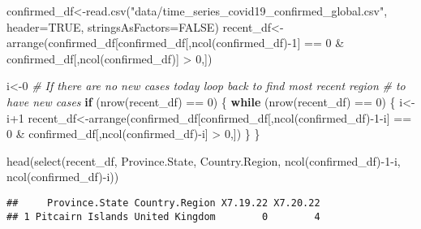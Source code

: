 \documentclass[
]{article}
\newenvironment{Shaded}{\begin{snugshade}}{\end{snugshade}}
\newcommand{\AttributeTok}[1]{\textcolor[rgb]{0.77,0.63,0.00}{#1}}
\newcommand{\CommentTok}[1]{\textcolor[rgb]{0.56,0.35,0.01}{\textit{#1}}}
\newcommand{\ConstantTok}[1]{\textcolor[rgb]{0.00,0.00,0.00}{#1}}
\newcommand{\ControlFlowTok}[1]{\textcolor[rgb]{0.13,0.29,0.53}{\textbf{#1}}}
\newcommand{\DecValTok}[1]{\textcolor[rgb]{0.00,0.00,0.81}{#1}}
\newcommand{\FunctionTok}[1]{\textcolor[rgb]{0.00,0.00,0.00}{#1}}
\newcommand{\NormalTok}[1]{#1}
\newcommand{\OtherTok}[1]{\textcolor[rgb]{0.56,0.35,0.01}{#1}}
\newcommand{\SpecialCharTok}[1]{\textcolor[rgb]{0.00,0.00,0.00}{#1}}
\newcommand{\StringTok}[1]{\textcolor[rgb]{0.31,0.60,0.02}{#1}}
\begin{document}
\begin{Shaded}
\begin{Highlighting}[]
\NormalTok{confirmed\_df}\OtherTok{\textless{}{-}}\FunctionTok{read.csv}\NormalTok{(}\StringTok{"data/time\_series\_covid19\_confirmed\_global.csv"}\NormalTok{, }
                       \AttributeTok{header=}\ConstantTok{TRUE}\NormalTok{, }\AttributeTok{stringsAsFactors=}\ConstantTok{FALSE}\NormalTok{)}
\NormalTok{recent\_df}\OtherTok{\textless{}{-}}\FunctionTok{arrange}\NormalTok{(confirmed\_df[confirmed\_df[,}\FunctionTok{ncol}\NormalTok{(confirmed\_df)}\SpecialCharTok{{-}}\DecValTok{1}\NormalTok{] }\SpecialCharTok{==} \DecValTok{0} 
                                \SpecialCharTok{\&}\NormalTok{ confirmed\_df[,}\FunctionTok{ncol}\NormalTok{(confirmed\_df)] }\SpecialCharTok{\textgreater{}} \DecValTok{0}\NormalTok{,])}

\NormalTok{i}\OtherTok{\textless{}{-}}\DecValTok{0}
\CommentTok{\# If there are no new cases today loop back to find most recent region}
\CommentTok{\# to have new cases}
\ControlFlowTok{if}\NormalTok{ (}\FunctionTok{nrow}\NormalTok{(recent\_df) }\SpecialCharTok{==} \DecValTok{0}\NormalTok{) \{}
  \ControlFlowTok{while}\NormalTok{ (}\FunctionTok{nrow}\NormalTok{(recent\_df) }\SpecialCharTok{==} \DecValTok{0}\NormalTok{) \{}
\NormalTok{    i}\OtherTok{\textless{}{-}}\NormalTok{i}\SpecialCharTok{+}\DecValTok{1}
\NormalTok{    recent\_df}\OtherTok{\textless{}{-}}\FunctionTok{arrange}\NormalTok{(confirmed\_df[confirmed\_df[,}\FunctionTok{ncol}\NormalTok{(confirmed\_df)}\SpecialCharTok{{-}}\DecValTok{1}\SpecialCharTok{{-}}\NormalTok{i] }\SpecialCharTok{==} \DecValTok{0} 
                                \SpecialCharTok{\&}\NormalTok{ confirmed\_df[,}\FunctionTok{ncol}\NormalTok{(confirmed\_df)}\SpecialCharTok{{-}}\NormalTok{i] }\SpecialCharTok{\textgreater{}} \DecValTok{0}\NormalTok{,])}
\NormalTok{  \}}
\NormalTok{\}}

\FunctionTok{head}\NormalTok{(}\FunctionTok{select}\NormalTok{(recent\_df, Province.State, Country.Region, }\FunctionTok{ncol}\NormalTok{(confirmed\_df)}\SpecialCharTok{{-}}\DecValTok{1}\SpecialCharTok{{-}}\NormalTok{i, }
            \FunctionTok{ncol}\NormalTok{(confirmed\_df)}\SpecialCharTok{{-}}\NormalTok{i))}
\end{Highlighting}
\end{Shaded}

\begin{verbatim}
##     Province.State Country.Region X7.19.22 X7.20.22
## 1 Pitcairn Islands United Kingdom        0        4
\end{verbatim}
\end{document}
